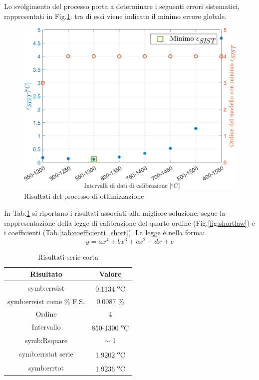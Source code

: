 Lo svolgimento del processo porta a determinare i seguenti errori sistematici, rappresentati in Fig.\ref{fig:errsistshort}: tra di essi viene indicato il minimo errore globale. 
\begin{figure}[H]
	\centering
	\includegraphics[width=0.6\linewidth]{"../sperimentazione nei propulsori/err_sist_short"}
	\caption{Risultati del processo di ottimizzazione}
	\label{fig:errsistshort}
\end{figure}
In Tab.\ref{tab:risshort} si riportano i risultati associati alla migliore soluzione; segue la rappresentazione della legge di calibrazione del quarto ordine (Fig.\ref{fig:shortlaw}) e i coefficienti (Tab.\ref{tab:coefficienti_short}).
La legge è nella forma:
\begin{equation}
	y = ax^4+bx^3+cx^2+dx+e
\end{equation}
\begin{table}[H]
	\centering
	\begin{tabular}{c|c}
		\toprule
		\toprule
		\textbf{Risultato} & \textbf{Valore} \\
		\midrule
		\midrule
		\gls{symb:errsist}& 0.1134 \textsuperscript{o}C\\
		\midrule
		\gls{symb:errsist} come \% F.S. & 0.0087 \%\\
		\midrule
		Ordine & 4 \\
		\midrule
		Intervallo & 850-1300 \textsuperscript{o}C\\
		\midrule
		\gls{symb:Rsquare} & $\sim$ 1\\
		\midrule
		\gls{symb:errstat} serie & 1.9202 \textsuperscript{o}C \\
		\midrule
		\gls{symb:errtot} & 1.9236 \textsuperscript{o}C \\
		\bottomrule
		\bottomrule
	\end{tabular}
\caption{Risultati serie corta}
\label{tab:risshort}
\end{table}

